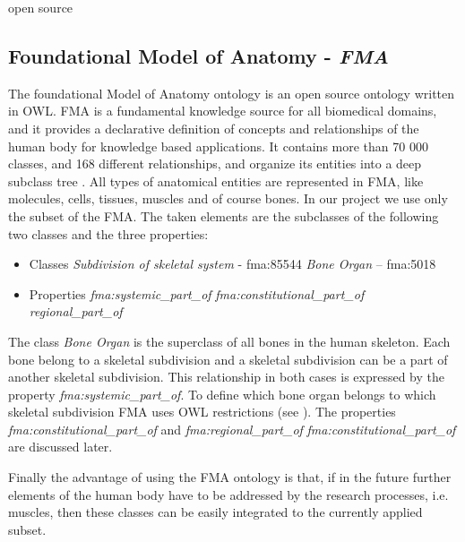 open source


\subsection{Foundational Model of Anatomy - \textit{FMA}} 

The foundational Model of Anatomy ontology is an open source ontology written in OWL. FMA is a fundamental knowledge source for all biomedical domains, and it provides a declarative definition of concepts and relationships of the human body for knowledge based applications. It contains more than 70 000 classes, and 168 different relationships, and organize its entities into a deep subclass tree \cite{Rosse2003478}. All types of anatomical entities are represented in FMA, like molecules, cells, tissues, muscles and of course bones. In our project we use only the subset of the FMA. The taken elements are the subclasses of the following two classes and the three properties: 

\begin{itemize}
	\item{Classes}
		\subitem \textit{Subdivision of skeletal system} - fma:85544 
		\subitem \textit{Bone Organ} – fma:5018
\end{itemize}

\begin{itemize}
	\item{Properties}
		\subitem \textit{fma:systemic\_part\_of}
		\subitem \textit{fma:constitutional\_part\_of}
		\subitem \textit{regional\_part\_of}
\end{itemize}

The class \textit{Bone Organ} is the superclass of all bones in the human skeleton. Each bone belong to a skeletal subdivision and a skeletal subdivision can be a part of another skeletal subdivision. This relationship in both cases is expressed by the property \textit{fma:systemic\_part\_of}. To define which bone organ belongs to which skeletal subdivision FMA uses OWL restrictions (see ). The properties \textit{fma:constitutional\_part\_of} and \textit{fma:regional\_part\_of} \textit{fma:constitutional\_part\_of} are discussed later.


Finally the advantage of using the FMA ontology is that, if in the future further elements of the human body have to be addressed by the research processes, i.e. muscles, then these classes can be easily integrated to the currently applied subset.

